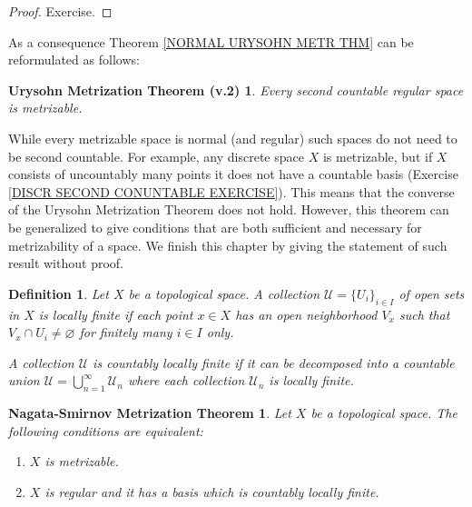 \documentclass[11pt, letterpaper, oneside]{report}
\theoremstyle{pplain}
\newtheorem{ITERMVALUE THM}[theorem]{Intermediate Value Theorem}
\newtheorem{HEINEBOREL THM}[theorem]{Heine-Borel Theorem}
\newtheorem{UMETR THM}[theorem]{Urysohn Metrization Theorem}
\newtheorem{UMETR2 THM}[theorem]{Urysohn Metrization Theorem (v.2)}
\newtheorem{NAGATASMIRNOVTHM}[theorem]{Nagata-Smirnov Metrization Theorem}
\theoremstyle{ddefinition}
\newtheorem{definition}[theorem]{Definition}
\theoremstyle{nnn}
\newtheorem{TDA NN}[theorem]{Topological Data Analysis. }
\theoremstyle{eexercise}
\begin{document}
\begin{proof}
Exercise.
\end{proof}

As a consequence  Theorem \ref{NORMAL URYSOHN METR THM}
can be reformulated as follows:


\begin{UMETR2 THM}
\label{REGULAR URYSOHN METR THM}
Every second countable regular space is metrizable. 
\end{UMETR2 THM}

While every metrizable space is normal (and regular) such spaces do not need to be second 
countable. For example, any discrete space $X$ is metrizable, but if $X$ consists of uncountably many 
points it does not have a countable basis (Exercise \ref{DISCR SECOND CONUNTABLE EXERCISE}). 
This means that the converse of the Urysohn Metrization Theorem 
does not hold. However, this theorem can be generalized to  give conditions that are both
sufficient and necessary for metrizability of a space. We finish this chapter by giving the statement 
of such result without proof. 

\begin{definition}
Let $X$ be a topological space. A collection $\mathcal{U} = \{U_{i}\}_{i\in I}$  of open sets in $X$
 is \emph{locally finite} if each point $x\in X$ has an open neighborhood $V_{x}$ such that 
$V_{x} \cap U_{i} \neq \varnothing$ for finitely many $i\in I$ only. 

A collection $\mathcal{U}$ is \emph{countably locally finite} if it can be decomposed into a 
countable union $\mathcal{U} = \bigcup_{n=1}^{\infty}\mathcal{U}_{n}$ where each collection 
$\mathcal{U}_{n}$ is locally finite. 
\end{definition}


\begin{NAGATASMIRNOVTHM}
\label{NAGATA-SMIRNOV THM}
Let $X$ be a topological space. The following conditions are equivalent:
\begin{enumerate}
\item $X$ is metrizable. 
\item $X$ is regular and it has a basis which is countably locally finite. 
\end{enumerate}
\end{NAGATASMIRNOVTHM}
 
\end{document}

